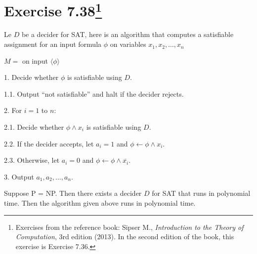 \section{\texorpdfstring{Exercise 7.38\footnote{%
Exercises from the reference book: Sipser M.,
\emph{Introduction to the Theory of Computation}, 3rd edition
(2013). In the
second edition of the book, this exercise is Exercise 7.36.}}{Exercise 7.38}}

Le \(D\) be a decider for SAT, here is an algorithm that computes a satisfiable
assignment for an input formula \(\phi\) on variables \(x_1,x_2,\ldots,x_n\)
\begin{TMachine}{\(M =\) on input \(\langle \phi \rangle\)}
\item[1.] Decide whether \(\phi\) is satisfiable using \(D\).
\item[1.1.] Output ``not satisfiable'' and halt if the decider rejects.
\item[2.] For \(i = 1\) to \(n\):
\item[2.1.] Decide whether \(\phi \land x_i\) is satisfiable using \(D\).
\item[2.2.] If the decider accepts, let \(a_i = 1\) and \(\phi \gets \phi \land
	x_i\).
\item[2.3.] Otherwise, let \(a_i = 0\) and \(\phi \gets \phi \land \overline{x_i}\).
\item[3.] Output \(a_1, a_2, \ldots, a_n\).
\end{TMachine}
Suppose P = NP. Then there exists a decider \(D\) for SAT that runs in
polynomial time. Then the algorithm given above runs in polynomial time.
